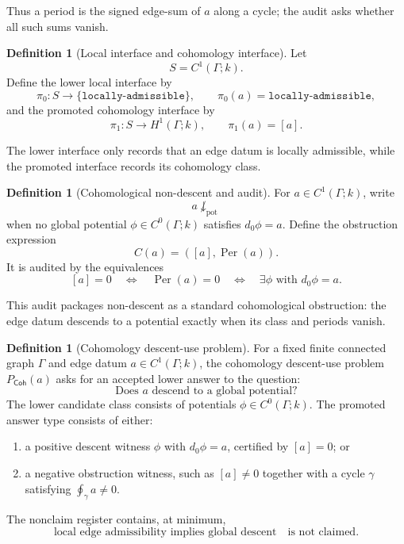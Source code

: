 \documentclass[11pt]{article}
\newcommand{\Coh}{\mathsf{Coh}}
\newcommand{\Per}{\operatorname{Per}}
\theoremstyle{definition}
\newtheorem{definition}[theorem]{Definition}
\begin{document}
Thus a period is the signed edge-sum of \(a\) along a cycle; the audit asks
whether all such sums vanish.

\begin{definition}[Local interface and cohomology interface]
\label{def:coh-interfaces}
Let
\[
S=C^1(\Gamma;k).
\]
Define the lower local interface by
\[
\pi_0:S\to\{\texttt{locally-admissible}\},
\qquad
\pi_0(a)=\texttt{locally-admissible},
\]
and the promoted cohomology interface by
\[
\pi_1:S\to H^1(\Gamma;k),
\qquad
\pi_1(a)=[a].
\]
\end{definition}

The lower interface only records that an edge datum is locally admissible, while
the promoted interface records its cohomology class.

\begin{definition}[Cohomological non-descent and audit]
\label{def:coh-nondesc-audit}
For \(a\in C^1(\Gamma;k)\), write
\[
a\not\downarrow_{\mathrm{pot}}
\]
when no global potential \(\phi\in C^0(\Gamma;k)\) satisfies \(d_0\phi=a\).  Define the obstruction expression
\[
C(a)=([a],\Per(a)).
\]
It is audited by the equivalences
\[
[a]=0
\quad\Longleftrightarrow\quad
\Per(a)=0
\quad\Longleftrightarrow\quad
\exists\phi\text{ with }d_0\phi=a.
\]
\end{definition}

This audit packages non-descent as a standard cohomological obstruction: the
edge datum descends to a potential exactly when its class and periods vanish.

\begin{definition}[Cohomology descent-use problem]
\label{def:coh-descent-use-problem}
For a fixed finite connected graph \(\Gamma\) and edge datum \(a\in C^1(\Gamma;k)\), the cohomology descent-use problem \(P_{\Coh}(a)\) asks for an accepted lower answer to the question:
\[
\text{Does }a\text{ descend to a global potential?}
\]
The lower candidate class consists of potentials \(\phi\in C^0(\Gamma;k)\).  The promoted answer type consists of either:
\begin{enumerate}
\item a positive descent witness \(\phi\) with \(d_0\phi=a\), certified by \([a]=0\); or
\item a negative obstruction witness, such as \([a]\neq0\) together with a cycle \(\gamma\) satisfying \(\oint_\gamma a\neq0\).
\end{enumerate}
The nonclaim register contains, at minimum,
\[
\text{local edge admissibility implies global descent}
\quad\text{is not claimed.}
\]
\end{definition}
\end{document}
